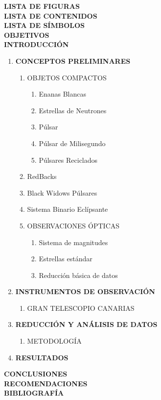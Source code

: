 \noindent \textbf{LISTA DE FIGURAS}\\
\textbf{LISTA DE CONTENIDOS}\\
\textbf{LISTA DE SÍMBOLOS}\\
\textbf{OBJETIVOS}\\
\textbf{INTRODUCCIÓN}
\begin{enumerate}[leftmargin=0.5cm, label=\textbf{\arabic*}.]
    \item \textbf{CONCEPTOS PRELIMINARES}
    \begin{enumerate}[label=1.\arabic*.]
        \item OBJETOS COMPACTOS
        \begin{enumerate}[label=1.1.\arabic*.]
            \item Enanas Blancas
            \item Estrellas de Neutrones
            \item P\'ulsar
            \item P\'ulsar de Milisegundo
            \item P\'ulsares Reciclados
        \end{enumerate}
        \item RedBacks
        \item Black Widows P\'ulsares
        \item Sistema Binario Eclípsante
        \item OBSERVACIONES ÓPTICAS
        \begin{enumerate}[label=1.5.\arabic*.]
            \item Sistema de magnitudes
            \item Estrellas estándar
            \item Reducción básica de datos
        \end{enumerate}
    \end{enumerate}
    \item \textbf{INSTRUMENTOS DE OBSERVACIÓN}
    \begin{enumerate}[label=2.\arabic*.]
        \item GRAN TELESCOPIO CANARIAS
    \end{enumerate}
    
    \item \textbf{REDUCCIÓN Y ANÁLISIS DE DATOS}
    \begin{enumerate}[label=3.\arabic*.]
        \item METODOLOGÍA
    \end{enumerate}
    \item \textbf{RESULTADOS}
\end{enumerate}
\textbf{CONCLUSIONES}\\
\textbf{RECOMENDACIONES}\\
\textbf{BIBLIOGRAFÍA}

